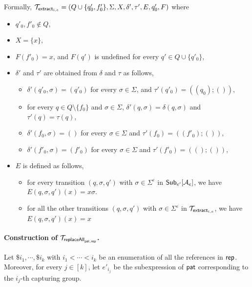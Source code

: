 Formally, $\mathcal{T}_{\mathsf{extract}_{i,e}} = (Q \cup \{q'_0, f'_0\}, \Sigma, X, \delta', \tau', E, q'_0, F)$ where 
\begin{itemize}
\item $q'_0, f'_0 \not \in Q$,

\item  $X = \{x\}$,
%
\item $F(f'_0) = x$, and $F(q')$ is undefined for every $q' \in Q \cup \{q'_0\}$,

\item $\delta'$ and $\tau'$ are obtained from $\delta$ and $\tau$ as follows,
\begin{itemize}
\item $\delta'(q'_0, \sigma) = (q'_0)$ for every $\sigma \in \Sigma$, and $\tau'(q'_0) = ((q_0); ())$,
%
\item  for every $q \in Q \setminus \{f_0\}$ and $\sigma \in \Sigma$, $\delta'(q, \sigma) = \delta(q, \sigma)$ and $\tau'(q) = \tau(q)$, 
%
\item $\delta'(f_0, \sigma) = ()$ for every $\sigma \in \Sigma$ and $\tau'(f_0) = ((f'_0); ())$,
%
\item $\delta'(f'_0, \sigma) = (f'_0)$ for every $\sigma \in \Sigma$ and $\tau'(f'_0) = ((); ())$,
\end{itemize}
%
\item $E$ is defined as follows, 
\begin{itemize}
\item for every transition $(q, \sigma, q')$ with  $\sigma \in \Sigma^\varepsilon$ in ${\sf Sub}_{e'}[\mathcal{A}_e]$, we have $E(q, \sigma, q')(x) = x\sigma$.
\item for all the other transitions $(q, \sigma, q')$ with $\sigma \in \Sigma^\varepsilon$ in $\mathcal{T}_{\mathsf{extract}_{i,e}}$, we have $E(q, \sigma, q')(x) = x$
\end{itemize}
%
\end{itemize}



\paragraph*{Construction of $\mathcal{T}_{\mathsf{replaceAll}_{\mathsf{pat}, \mathsf{rep}}}$.} 
Let $\$i_1, \cdots, \$i_k$ with $i_1 < \cdots < i_k$ be an enumeration of all the references in $\mathsf{rep}$. 
Moreover, for every $j \in [k]$, let $e'_{i_j}$ be the subexpression of $\mathsf{pat}$ corresponding to the $i_j$-th capturing group.

